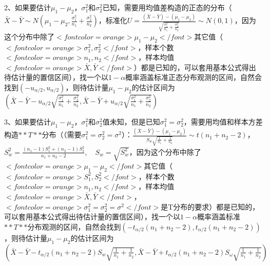 2、如果要估计$ \mu_1-\mu_2 $，$ \sigma_{1}^{2} $和$ \sigma_{2}^{2} $已知，需要用均值差构造的正态的分布（$ \bar{X}-\bar{Y} \sim N\left(\mu_{1}-\mu_{2}, \frac{\sigma_{1}^{2}}{n_{1}}+\frac{\sigma_{2}^{2}}{n_{2}}\right) $，标准化$  U=\frac{(\bar{X}-\bar{Y})-\left(\mu_{1}-\mu_{2}\right)}{\sqrt{\frac{\sigma_{1}^{2}}{n_{1}}+\frac{\sigma_{2}^{2}}{n_{2}}}} \sim N(0,1) $，因为这个分布中除了$ <font color=orange>\mu_{1}-\mu_{2}</font> $其它值（$ <font color=orange>\sigma_{1}^{2},\sigma_{2}^{2}</font> $，样本个数$ <font color=orange>n_1,n_2</font> $，样本均值$ <font color=orange>\bar{X},\bar{Y}</font> $）都是已知的，可以套用基本公式得出待估计量的置信区间），找一个以$ 1−α $概率涵盖标准正态分布观测的区间，自然会找到$ (−u_{\alpha/2},u_{\alpha/2}) $，则待估计量$ \mu_1-\mu_2 $的估计区间为$  \left(\bar{X}-\bar{Y}-u_{{\alpha}/{2}} \sqrt{\frac{\sigma_{1}^{2}}{n_{1}}+\frac{\sigma_{2}^{2}}{n_{2}}}, \bar{X}-\bar{Y}+u_{{\alpha}/{2}} \sqrt{\frac{\sigma_{1}^{2}}{n_{1}}+\frac{\sigma_{2}^{2}}{n_{2}}}\right) $

3、如果要估计$ \mu_1-\mu_2 $，$ \sigma_{1}^{2} $和$ \sigma_{2}^{2} $值未知，但是已知$ \sigma_{1}^{2}=\sigma_{2}^{2} $，需要用均值和样本方差构造$ **T** $分布（（需要$ \sigma_{1}^{2}=\sigma_{2}^{2}=\sigma^{2} $）：$ \frac{(\bar{X}-\bar{Y})-\left(\mu_{1}-\mu_{2}\right)}{S_{w} \sqrt{\frac{1}{n_{1}}+\frac{1}{n_{2}}}} \sim t\left(n_{1}+n_{2}-2\right) $，$ S_{w}^{2}=\frac{\left(n_{1}-1\right) S_{1}^{2}+\left(n_{2}-1\right) S_{2}^{2}}{n_{1}+n_{2}-2}, \quad S_{w}=\sqrt{S_{w}^{2}} $，因为这个分布中除了$ <font color=orange>\mu_{1}-\mu_{2}</font> $其它值（$ <font color=orange>S_{1}^{2},S_{2}^{2}</font> $，样本个数$ <font color=orange>n_1,n_2</font> $，样本均值$ <font color=orange>\bar{X},\bar{Y}</font> $，$ <font color=orange>\sigma_{1}^{2}=\sigma_{2}^{2}=\sigma^{2}</font> $是T分布的要求）都是已知的，可以套用基本公式得出待估计量的置信区间），找一个以$ 1−α $概率涵盖标准$ **T** $分布观测的区间，自然会找到$ (−t_{\alpha/2}(n_{1}+n_{2}-2),t_{\alpha/2}(n_{1}+n_{2}-2)) $，则待估计量$ \mu_1-\mu_2 $的估计区间为$ \left(\bar{X}-\bar{Y}-t_{{\alpha}/{2}}\left(n_{1}+n_{2}-2\right) S_{w} \sqrt{\frac{1}{n_{1}}+\frac{1}{n_{2}}}\right. ,\left.\bar{X}-\bar{Y}+t_{{\alpha}/{2}}\left(n_{1}+n_{2}-2\right) S_{\omega} \sqrt{\frac{1}{n_{1}}+\frac{1}{n_{2}}}\right) $

